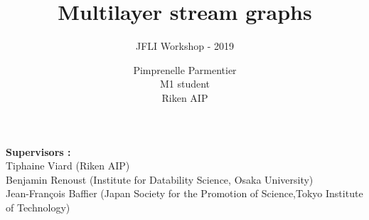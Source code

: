 \documentclass[15pt]{beamer}
\title{Multilayer stream graphs} %
\subtitle{JFLI Workshop - 2019}
\author{Pimprenelle Parmentier \\ M1 student\\ Riken AIP} %
\institute{\textit{pimprenelle.parmentier@polytechnique.edu}}
\date{}
\begin{document}
\begin{frame}
\titlepage %
\centering
\textbf{Supervisors :} \\
Tiphaine Viard {\footnotesize(Riken AIP)}\\
Benjamin Renoust {\scriptsize(Institute for Datability Science}, {\footnotesize Osaka University)}\\
Jean-François Baffier {\scriptsize(Japan Society for the Promotion of Science},{\footnotesize Tokyo Institute of Technology)}
\end{frame}

\end{document}
